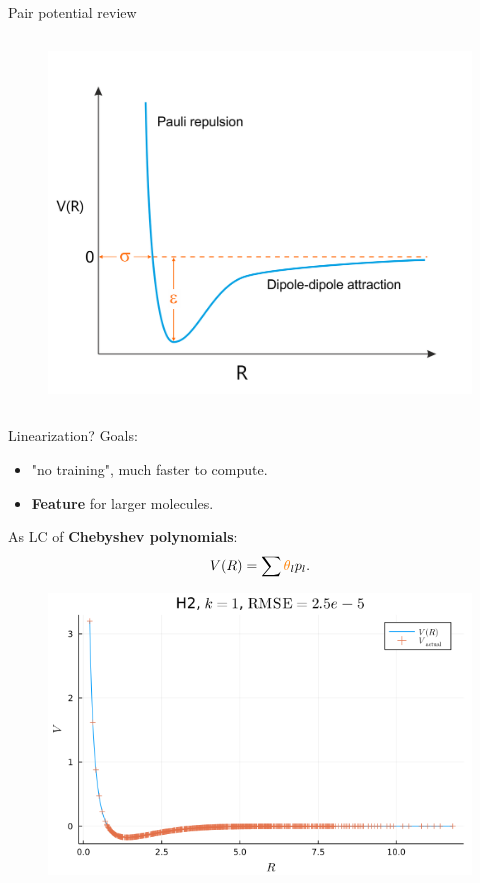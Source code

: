 \documentclass{beamer}
\begin{document}
\begin{frame}{Pair potential review}
\begin{columns}
\begin{column}{0.5\textwidth}
\begin{figure}[htbp]
                    \includegraphics[scale=0.18]{img/slide/lennard_jones_potential_edit.png}
                \label{fig:ozone}
            \end{figure}
        \end{column}
    \end{columns}
\end{frame}

\begin{frame}{Linearization?}
    Goals: 
    \begin{itemize}
        \item "no training", much faster to compute.
        \item \textbf{Feature} for larger molecules.
    \end{itemize}
    As LC of \textbf{Chebyshev polynomials}:
    \begin{equation}
        V(R) = \sum {\color{orange}\theta}_l p_l.
    \end{equation}
    \begin{figure}[H]
        \centering
            \includegraphics[scale=0.3]{img/linear_RATPOT/linratpot_linsolve_H2_example3.png}
        \label{fig:linratpot_linsolve_H2}
    \end{figure}
\end{frame}
\end{document}
